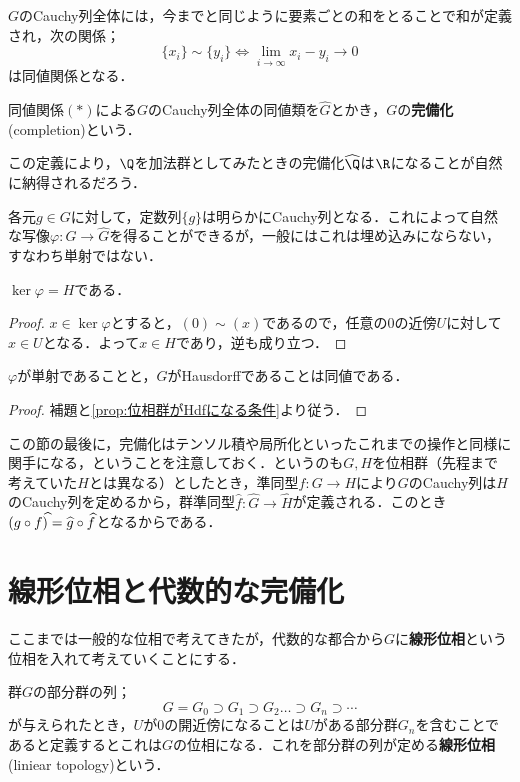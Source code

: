 $G$のCauchy列全体には，今までと同じように要素ごとの和をとることで和が定義され，次の関係；
\[\{x_i\}\sim\{y_i\}\Longleftrightarrow \lim_{i\to\infty} x_i-y_i\to 0\tag{$\ast$}\]
は同値関係となる．

\begin{defi}[完備化]
	同値関係$(\ast)$による$G$のCauchy列全体の同値類を$\widehat G$とかき，$G$の\textbf{完備化}(completion)という．
\end{defi}

この定義により，$\Q$を加法群としてみたときの完備化$\widehat{\Q}$は$\R$になることが自然に納得されるだろう．

各元$g\in G$に対して，定数列$\{g\}$は明らかにCauchy列となる．これによって自然な写像$\varphi:G\to\widehat{G}$を得ることができるが，一般にはこれは埋め込みにならない，すなわち単射ではない．

\begin{lem}
	$\ker\varphi=H$である．
\end{lem}

\begin{proof}
	$x\in\ker\varphi$とすると，$(0)\sim(x)$であるので，任意の$0$の近傍$U$に対して$x\in U$となる．よって$x\in H$であり，逆も成り立つ．
\end{proof}

\begin{prop}
	$\varphi$が単射であることと，$G$がHausdorffであることは同値である．
\end{prop}

\begin{proof}
	補題と\ref{prop:位相群がHdfになる条件}より従う．
\end{proof}

この節の最後に，完備化はテンソル積や局所化といったこれまでの操作と同様に関手になる，ということを注意しておく．というのも$G,H$を位相群（先程まで考えていた$H$とは異なる）としたとき，準同型$f:G\to H$により$G$のCauchy列は$H$のCauchy列を定めるから，群準同型$\widehat{f}:\widehat{G}\to\widehat{H}$が定義される．このとき$(g\circ f)\widehat{\mathstrut}=\widehat{g}\circ\widehat{f}$となるからである．
\section{線形位相と代数的な完備化}

ここまでは一般的な位相で考えてきたが，代数的な都合から$G$に\textbf{線形位相}という位相を入れて考えていくことにする．

\begin{defi}[線形位相]
	群$G$の部分群の列；
	\[G=G_0\supset G_1\supset G_2\dots\supset G_n\supset\cdots\]
	が与えられたとき，$U$が$0$の開近傍になることは$U$がある部分群$G_n$を含むことであると定義するとこれは$G$の位相になる．これを部分群の列が定める\textbf{線形位相}(liniear topology)という．
\end{defi}

